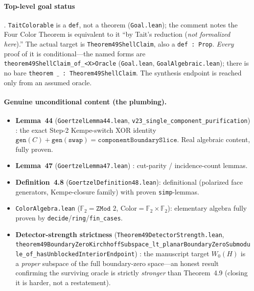 \paragraph{Top-level goal status} .
\texttt{TaitColorable} is a \texttt{def}, not a theorem
(\texttt{Goal.lean}); the comment notes the Four Color Theorem is equivalent to
it ``by Tait's reduction (\emph{not formalized here}).'' The actual target is
\texttt{Theorem49ShellClaim}, also a \texttt{def : Prop}. \emph{Every} proof of
it is conditional---the named forms are
\texttt{theorem49ShellClaim\_of\_<X>Oracle}
(\texttt{Goal.lean}, \texttt{GoalAlgebraic.lean}); there is no bare
\texttt{theorem $\_$ : Theorem49ShellClaim}. The synthesis endpoint is reached
only from an assumed oracle.

\paragraph{Genuine unconditional content (the plumbing).}
\begin{itemize}
  \item \textbf{Lemma~44} (\texttt{GoertzelLemma44.lean},
  \texttt{v23\_single\_component\_purification}) : the
  exact Step-2 Kempe-switch XOR identity
  $\texttt{gen}(C)+\texttt{gen}(\texttt{swap})=\texttt{componentBoundarySlice}$.
  Real algebraic content, fully proven.
  \item \textbf{Lemma~47} (\texttt{GoertzelLemma47.lean})
  : cut-parity / incidence-count lemmas.
  \item \textbf{Definition~4.8} (\texttt{GoertzelDefinition48.lean}):
  definitional (polarized face generators, Kempe-closure family) with proven
  \texttt{simp}-lemmas.
  \item \texttt{ColorAlgebra.lean} ($\mathbb{F}_2=\texttt{ZMod }2$, $\text{Color}
  =\mathbb{F}_2\times\mathbb{F}_2$): elementary algebra fully proven by
  \texttt{decide}/\texttt{ring}/\texttt{fin\_cases}.
  \item \textbf{Detector-strength strictness}
  (\texttt{Theorem49DetectorStrength.lean},
  \texttt{theorem49BoundaryZeroKirchhoffSubspace\_lt\_planarBoundaryZeroSubmodule\_of\_hasUnblockedInteriorEndpoint})
  : the manuscript target $W_0(H)$ is a \emph{proper}
  subspace of the full boundary-zero space---an honest result confirming the
  surviving oracle is strictly \emph{stronger} than Theorem~4.9 (closing it is
  harder, not a restatement).
\end{itemize}

